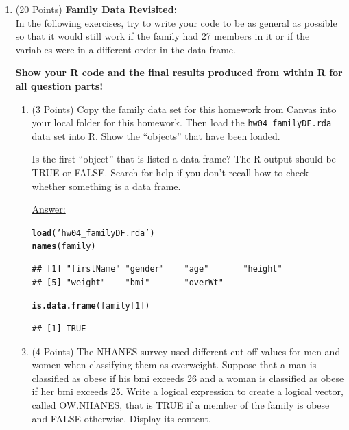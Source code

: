 \documentclass[12pt,letterpaper,final]{article}\usepackage[]{graphicx}\usepackage[]{xcolor}
\makeatletter
\newcommand{\hlnum}[1]{\textcolor[rgb]{0.686,0.059,0.569}{#1}}%
\newcommand{\hlstr}[1]{\textcolor[rgb]{0.192,0.494,0.8}{#1}}%
\newcommand{\hlstd}[1]{\textcolor[rgb]{0.345,0.345,0.345}{#1}}%
\newcommand{\hlkwd}[1]{\textcolor[rgb]{0.737,0.353,0.396}{\textbf{#1}}}%
\newenvironment{kframe}{%
 \def\at@end@of@kframe{}%
 \ifinner\ifhmode%
  \def\at@end@of@kframe{\end{minipage}}%
  \begin{minipage}{\columnwidth}%
 \fi\fi%
 \def\FrameCommand##1{\hskip\@totalleftmargin \hskip-\fboxsep
 \colorbox{shadecolor}{##1}\hskip-\fboxsep
     \hskip-\linewidth \hskip-\@totalleftmargin \hskip\columnwidth}%
 \MakeFramed {\advance\hsize-\width
   \@totalleftmargin\z@ \linewidth\hsize
   \@setminipage}}%
 {\par\unskip\endMakeFramed%
 \at@end@of@kframe}
\newenvironment{knitrout}{}{} %
\makeatother
\begin{document}
\begin{enumerate}

\item (20 Points) {\bf Family Data Revisited:} \\
In the following exercises, try to write your code to be as general as possible
so that it would still work if the family had 27 members in it or if the 
variables were in a different order in the data frame.

{\bf Show your R code and the final results produced from within R
for all question parts!}


\begin{enumerate}
\item (3 Points)
Copy the family data set for this homework from Canvas into your local folder for this homework.
Then load the \verb|hw04_familyDF.rda| data set into R. Show the ``objects'' that have been loaded.

Is the first ``object'' that is listed a data frame? The R output should be TRUE or FALSE.
Search for help if you don't recall how
to check whether something is a data frame.

\underline{Answer:}
\begin{knitrout}
\color{fgcolor}\begin{kframe}
\begin{alltt}
\hlkwd{load}\hlstd{(}\hlstr{'hw04_familyDF.rda'}\hlstd{)}
\hlkwd{names}\hlstd{(family)}
\end{alltt}
\begin{verbatim}
## [1] "firstName" "gender"    "age"       "height"   
## [5] "weight"    "bmi"       "overWt"
\end{verbatim}
\begin{alltt}
\hlkwd{is.data.frame}\hlstd{(family[}\hlnum{1}\hlstd{])}
\end{alltt}
\begin{verbatim}
## [1] TRUE
\end{verbatim}
\end{kframe}
\end{knitrout}


\item (4 Points)
The NHANES survey used different cut-off values for men and women when classifying
them as overweight.  Suppose that a man is classified as obese if his bmi exceeds 26
and a woman is classified as obese if her bmi exceeds 25.
Write a logical expression to create a logical vector, called OW.NHANES, that is TRUE if 
a member of the family is obese and FALSE otherwise. Display its content.


\end{enumerate}
\end{enumerate}
\end{document}
